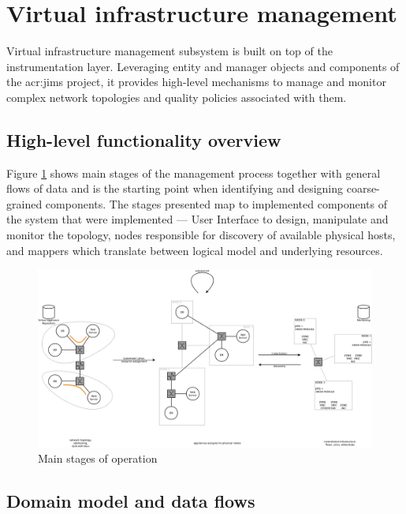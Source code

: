 \documentclass[11pt,openany]{book}
\begin{document}
    \section{Virtual infrastructure management}
    \label{sec:arch:vi}

      Virtual infrastructure management subsystem is built on top of the instrumentation layer. Leveraging entity and
      manager objects and components of the \gls{acr:jims} project, it provides high-level mechanisms to manage and monitor
      complex network topologies and quality policies associated with them.


      \subsection{High-level functionality overview}
      \label{sub:arch:hl}

        Figure \ref{fig:arch:hl} shows main stages of the management process together with general flows of data and is
        the starting point when identifying and designing coarse-grained components. The stages presented map to
        implemented components of the system that were implemented --- User Interface to design, manipulate and monitor
        the topology, nodes responsible for discovery of available physical hosts, and mappers which translate between
        logical model and underlying resources.

        \begin{figure}[H]
          \centering
          \includegraphics[angle=90, height=.95\textheight]{img/architecture/scope.pdf}

          \caption{Main stages of operation}
          \label{fig:arch:hl}
        \end{figure}


      \subsection{Domain model and data flows}
      \label{sec:domain-model}
\end{document}
